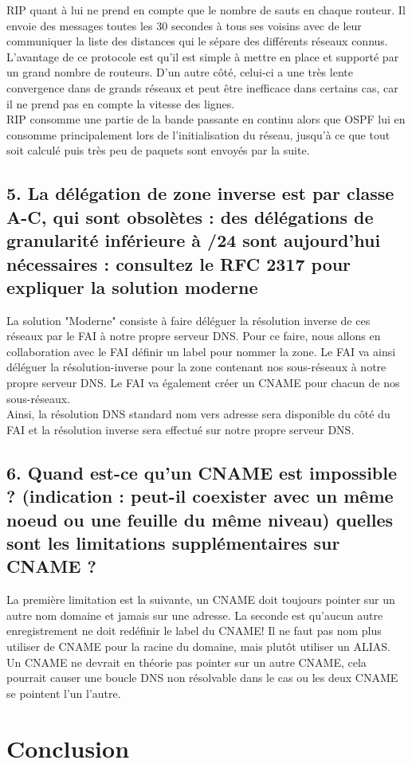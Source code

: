 \documentclass{article}
\begin{document}
RIP quant à lui ne prend en compte que le nombre de sauts en chaque routeur. Il envoie des messages toutes les 30 secondes à tous ses voisins avec de leur communiquer la liste des distances qui le sépare des différents réseaux connus. L'avantage de ce protocole est qu'il est simple à mettre en place et supporté par un grand nombre de routeurs. D'un autre côté, celui-ci a une très lente convergence dans de grands réseaux et peut être inefficace dans certains cas, car il ne prend pas en compte la vitesse des lignes.\cite{RIP-VS-OSPF}\\

RIP consomme une partie de la bande passante en continu alors que OSPF lui en consomme principalement lors de l'initialisation du réseau, jusqu'à ce que tout soit calculé puis très peu de paquets sont envoyés par la suite.\\

\subsection*{5. La délégation de zone inverse est par classe A-C, qui sont obsolètes : des délégations de granularité inférieure à /24 sont aujourd’hui nécessaires : consultez le RFC 2317 pour expliquer la solution moderne}
La solution "Moderne" consiste à faire déléguer la résolution inverse de ces réseaux par le FAI à notre propre serveur DNS. Pour ce faire, nous allons en collaboration avec le FAI définir un label pour nommer la zone. Le FAI va ainsi déléguer la résolution-inverse pour la zone contenant nos sous-réseaux à notre propre serveur DNS. Le FAI va également créer un CNAME pour chacun de nos sous-réseaux.\\

Ainsi, la résolution DNS standard nom vers adresse sera disponible du côté du FAI et la résolution inverse sera effectué sur notre propre serveur DNS\cite{RFC-2317-ietf}\cite{RFC-2317-divers}.

\subsection*{6. Quand est-ce qu’un CNAME est impossible ? (indication : peut-il coexister avec un même noeud ou une feuille du même niveau) quelles sont les limitations supplémentaires sur CNAME ?}
La première limitation est la suivante, un CNAME\cite{CNAME} doit toujours pointer sur un autre nom domaine et jamais sur une adresse. La seconde est qu'aucun autre enregistrement ne doit redéfinir le label du CNAME! Il ne faut pas nom plus utiliser de CNAME pour la racine du domaine, mais plutôt utiliser un ALIAS\cite{ALIAS}.\\

Un CNAME ne devrait en théorie pas pointer sur un autre CNAME, cela pourrait causer une boucle DNS non résolvable dans le cas ou les deux CNAME se pointent l'un l'autre.\cite{cname-limitations}\\

\section{Conclusion}

\newpage
\printbibliography
\end{document}
